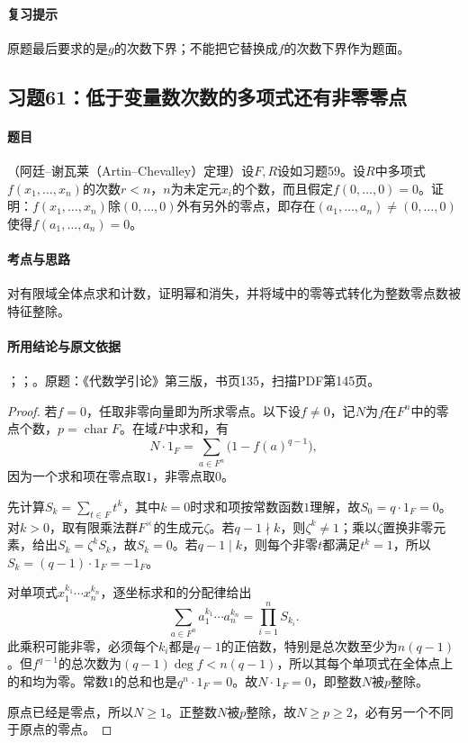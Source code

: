 \paragraph{复习提示}

原题最后要求的是$g$的次数下界；不能把它替换成$f$的次数下界作为题面。



\subsection{习题61：低于变量数次数的多项式还有非零零点}

\label{ex:3:61}

\paragraph{题目}

（阿廷--谢瓦莱（Artin--Chevalley）定理）设$F,R$设如习题59。设$R$中多项式$f(x_1,\ldots,x_n)$的次数$r<n$，$n$为未定元$x_i$的个数，而且假定$f(0,\ldots,0)=0$。证明：$f(x_1,\ldots,x_n)$除$(0,\ldots,0)$外有另外的零点，即存在$(a_1,\ldots,a_n)\ne(0,\ldots,0)$使得$f(a_1,\ldots,a_n)=0$。

\paragraph{考点与思路}

对有限域全体点求和计数，证明幂和消失，并将域中的零等式转化为整数零点数被特征整除。

\paragraph{所用结论与原文依据}

；；。原题：《代数学引论》第三版，书页135，扫描PDF第145页。


\begin{proof}

若$f=0$，任取非零向量即为所求零点。以下设$f\ne0$，记$N$为$f$在$F^n$中的零点个数，$p=\operatorname{char}F$。在域$F$中求和，有
\[
N\cdot1_F=\sum_{a\in F^n}\bigl(1-f(a)^{q-1}\bigr),
\]
因为一个求和项在零点取$1$，非零点取$0$。

先计算$S_k=\sum_{t\in F}t^k$，其中$k=0$时求和项按常数函数$1$理解，故$S_0=q\cdot1_F=0$。对$k>0$，取有限乘法群$F^\times$的生成元$\zeta$。若$q-1\nmid k$，则$\zeta^k\ne1$；乘以$\zeta$置换非零元素，给出$S_k=\zeta^k S_k$，故$S_k=0$。若$q-1\mid k$，则每个非零$t$都满足$t^k=1$，所以$S_k=(q-1)\cdot1_F=-1_F$。

对单项式$x_1^{k_1}\cdots x_n^{k_n}$，逐坐标求和的分配律给出
\[
\sum_{a\in F^n}a_1^{k_1}\cdots a_n^{k_n}=\prod_{i=1}^n S_{k_i}.
\]
此乘积可能非零，必须每个$k_i$都是$q-1$的正倍数，特别是总次数至少为$n(q-1)$。但$f^{q-1}$的总次数为$(q-1)\deg f<n(q-1)$，所以其每个单项式在全体点上的和均为零。常数$1$的总和也是$q^n\cdot1_F=0$。故$N\cdot1_F=0$，即整数$N$被$p$整除。

原点已经是零点，所以$N\ge1$。正整数$N$被$p$整除，故$N\ge p\ge2$，必有另一个不同于原点的零点。

\end{proof}

